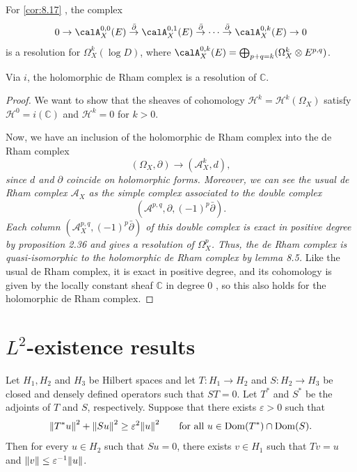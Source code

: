\documentclass[lang=en,12pt]{beautybook}
\begin{document}
For \autoref{cor:8.17} , the complex
\[
  0\rightarrow \calA_X^{0,0}(E)\stackrel{\bar{\partial}}{\rightarrow}\calA_X^{0,1}(E)\stackrel{\bar{\partial}}{\rightarrow}\cdots\stackrel{\bar{\partial}}{\rightarrow}\calA_X^{0,k}(E)\rightarrow 0
\]
is a resolution for $\Omega_X^k (\log D)$, where $\calA_X^{0,k}(E)=\bigoplus_{p+q=k}(\Omega_X^{k}\otimes E^{p,q}) $.

\begin{lemma}
  Via $i$, the holomorphic de Rham complex is a resolution of $\mathbb{C}$.

\end{lemma}
\begin{proof}
  We want to show that the sheaves of cohomology $\mathcal{H}^k=\mathcal{H}^k\left(\Omega_X\right)$ satisfy $\mathcal{H}^0=i(\mathbb{C})$ and $\mathcal{H}^k=0$ for $k>0$.

  Now, we have an inclusion of the holomorphic de Rham complex into the de Rham complex
  \begin{equation*}
    \left(\Omega_X, \partial\right) \rightarrow\left(\mathcal{A}_X^k, d\right),
  \end{equation*}
  \textit{since $d$ and $\partial$ coincide on holomorphic forms. Moreover, we can see the usual de Rham complex $\mathcal{A}_X$ as the simple complex associated to the double complex}
  \begin{equation*}
    \left(\mathcal{A}^{p, q}, \partial,(-1)^p \bar{\partial}\right) .
  \end{equation*}
  \textit{Each column $\left(\mathcal{A}_X^{p, q},(-1)^p \bar{\partial}\right)$ of this double complex is exact in positive degree by proposition 2.36 and gives a resolution of $\Omega_X^p$. Thus, the de Rham complex is quasi-isomorphic to the holomorphic de Rham complex by lemma 8.5. }Like the usual de Rham complex, it is exact in positive degree, and its cohomology is given by the locally constant sheaf $\mathbb{C}$ in degree 0 , so this also holds for the holomorphic de Rham complex.
\end{proof}
\section{\texorpdfstring{$L^2$}{}-existence results}
\clearpage
\begin{lemma}
  Let $H_{1}, H_{2}$ and $H_{3}$ be Hilbert spaces and let $T \colon H_{1} \to H_{2}$ and $S \colon H_{2} \to H_{3}$ be closed and densely defined operators such that $ST = 0$. Let $T^*$ and $S^*$ be the adjoints of $T$ and $S$, respectively. Suppose that there exists $\varepsilon > 0$ such that
  \newcommand{\Dom}{\operatorname{Dom}}
  $$ \norm{T^* u}^{2} + \norm{S u}^{2} \geq \varepsilon^{2} \norm{u}^{2} \qquad \textnormal{for all } u \in \Dom(T^*) \cap \Dom(S).$$
  Then for every $u \in H_{2}$ such that $Su =0$, there exists $v \in H_{1}$ such that $Tv = u$ and $\norm{v} \leq \varepsilon^{-1} \norm{u}$.
\end{lemma}
\end{document}
